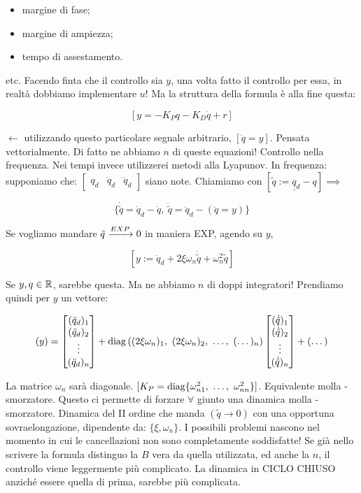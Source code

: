 \begin{itemize}

\item margine di fase;
\item margine di ampiezza;
\item tempo di assestamento.

\end{itemize}

etc. Facendo finta che il controllo sia $y$, una volta fatto il controllo per essa, in realtà dobbiamo implementare $u$! Ma la struttura della formula è alla fine questa:

\[
	[y = -K_Pq - K_D\dot{q} + r]
\]

$\leftarrow$ utilizzando questo particolare segnale arbitrario, $[\ddot{q}=y]$. Pensata vettorialmente. Di fatto ne abbiamo $n$ di queste equazioni! Controllo nella frequenza. Nei tempi invece utilizzerei metodi alla Lyapunov. In frequenza: supponiamo che: $\begin{bmatrix}q_d&\dot{q}_d&\ddot{q}_d\end{bmatrix}$ siano note. Chiamiamo con $[\underline{\tilde{q} := q_d-q}] \implies$

\[
	\{\dot{\tilde{q}} = \dot{q}_d - \dot{q},\ \ddot{\tilde{q}} = \ddot{q}_d - (\ddot{q}=y)\} 
\]

Se vogliamo mandare $\tilde{q}\tendsto{EXP} 0$ in maniera EXP, agendo su $y$,

\[
	[y := \ddot{q}_d + 2\xi\omega_n \dot{\tilde{q}} + \omega_n^2\tilde{q}]
\]

Se $y,q\in\mathbb{R}$, sarebbe questa. Ma ne abbiamo $n$ di doppi integratori! Prendiamo quindi per $y$ un vettore:

\[
	(y) = \begin{bmatrix}(\ddot{q}_d)_1\\(\ddot{q}_d)_2\\\vdots\\(\ddot{q}_d)_n\end{bmatrix} + \diag{((2\xi\omega_n)_1,\ (2\xi\omega_n)_2,\ \dots,\ (\dots)_n)}\begin{bmatrix}(\dot{\tilde{q}})_1\\(\dot{\tilde{q}})_2\\\vdots\\(\dot{\tilde{q}})_n\end{bmatrix} + (\dots)
\]

La matrice $\omega_n$ sarà diagonale. $[K_P=\diag\{\omega_{n1}^2,\ \dots,\ \omega_{nn}^2\}]$. Equivalente molla - smorzatore. Questo ci permette di forzare $\forall$ giunto una dinamica molla - smorzatore. Dinamica del II ordine che manda $(\tilde{q}\to 0)$ con una opportuna sovraelongazione, dipendente da: $\{\xi,\omega_n\}$. I possibili problemi nascono nel momento in cui le cancellazioni non sono completamente soddisfatte! Se già nello scrivere la formula distinguo la $B$ vera da quella utilizzata, ed anche la $n$, il controllo viene leggermente più complicato. La dinamica in CICLO CHIUSO anziché essere quella di prima, sarebbe più complicata.

